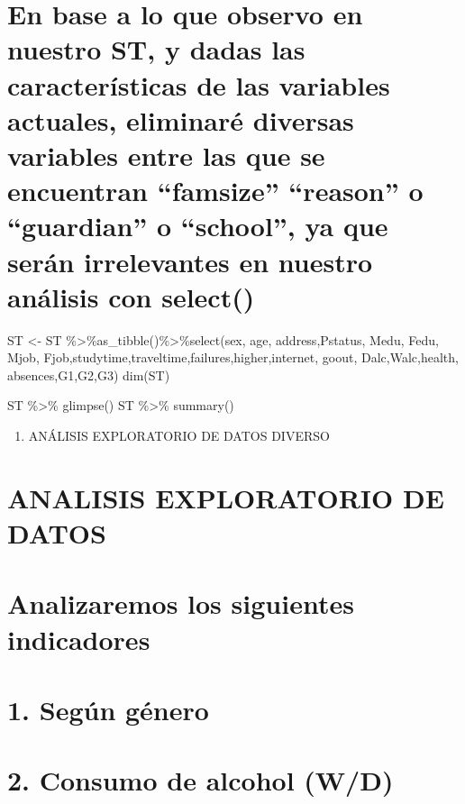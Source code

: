 \documentclass[]{article}
\providecommand{\tightlist}{%
  \setlength{\itemsep}{0pt}\setlength{\parskip}{0pt}}
\begin{document}
\section{\texorpdfstring{En base a lo que observo en nuestro ST, y dadas
las características de las variables actuales, eliminaré diversas
variables entre las que se encuentran ``famsize'' ``reason'' o
``guardian'' o ``school'', ya que serán irrelevantes en nuestro análisis
con
select()}{En base a lo que observo en nuestro ST, y dadas las características de las variables actuales, eliminaré diversas variables entre las que se encuentran famsize reason o guardian o school, ya que serán irrelevantes en nuestro análisis con select()}}\label{en-base-a-lo-que-observo-en-nuestro-st-y-dadas-las-caracteristicas-de-las-variables-actuales-eliminare-diversas-variables-entre-las-que-se-encuentran-famsize-reason-o-guardian-o-school-ya-que-seran-irrelevantes-en-nuestro-analisis-con-select}

ST \textless{}- ST
\%\textgreater{}\%as\_tibble()\%\textgreater{}\%select(sex, age,
address,Pstatus, Medu, Fedu, Mjob,
Fjob,studytime,traveltime,failures,higher,internet, goout,
Dalc,Walc,health, absences,G1,G2,G3) dim(ST)

ST \%\textgreater{}\% glimpse() ST \%\textgreater{}\% summary()

\begin{enumerate}
\def\labelenumi{\arabic{enumi}.}
\setcounter{enumi}{3}
\tightlist
\item
  ANÁLISIS EXPLORATORIO DE DATOS DIVERSO
\end{enumerate}

\section{ANALISIS EXPLORATORIO DE
DATOS}\label{analisis-exploratorio-de-datos}

\section{Analizaremos los siguientes
indicadores}\label{analizaremos-los-siguientes-indicadores}

\section{1. Según género}\label{segun-genero}

\section{2. Consumo de alcohol (W/D)}\label{consumo-de-alcohol-wd}
\end{document}
